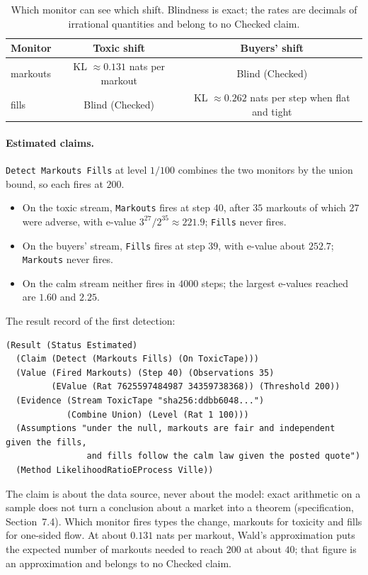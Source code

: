 \documentclass[11pt]{article}
\newcommand{\code}[1]{\texttt{#1}}
\newcommand{\spec}[1]{specification, Section~#1}
\theoremstyle{definition}
\theoremstyle{plain}
\begin{document}
\begin{table}[ht]
\centering\small
\begin{tabular}{lcc}
\toprule
Monitor & Toxic shift & Buyers' shift\\
\midrule
markouts & KL $\approx0.131$ nats per markout & Blind (Checked)\\
fills & Blind (Checked) & KL $\approx0.262$ nats per step when flat and tight\\
\bottomrule
\end{tabular}
\caption{Which monitor can see which shift. Blindness is exact; the rates are decimals of irrational
quantities and belong to no Checked claim.}\label{tab:ex4monitors}
\end{table}

\paragraph{Estimated claims.} \code{Detect Markouts Fills} at level $1/100$ combines the two monitors by
the union bound, so each fires at $200$.
\begin{itemize}
\item On the toxic stream, \code{Markouts} fires at step $40$, after $35$ markouts of which $27$ were
adverse, with e-value $3^{27}/2^{35}\approx221.9$; \code{Fills} never fires.
\item On the buyers' stream, \code{Fills} fires at step $39$, with e-value about $252.7$; \code{Markouts}
never fires.
\item On the calm stream neither fires in $4000$ steps; the largest e-values reached are $1.60$ and
$2.25$.
\end{itemize}
The result record of the first detection:
\begin{lstlisting}
(Result (Status Estimated)
  (Claim (Detect (Markouts Fills) (On ToxicTape)))
  (Value (Fired Markouts) (Step 40) (Observations 35)
         (EValue (Rat 7625597484987 34359738368)) (Threshold 200))
  (Evidence (Stream ToxicTape "sha256:ddbb6048...")
            (Combine Union) (Level (Rat 1 100)))
  (Assumptions "under the null, markouts are fair and independent given the fills,
                and fills follow the calm law given the posted quote")
  (Method LikelihoodRatioEProcess Ville))
\end{lstlisting}
The claim is about the data source, never about the model: exact arithmetic on a sample does not turn a
conclusion about a market into a theorem (\spec{7.4}). Which monitor fires types the change, markouts for
toxicity and fills for one-sided flow. At about $0.131$ nats per markout, Wald's approximation
\cite{wald} puts the expected number of markouts needed to reach $200$ at about $40$; that figure is an
approximation and belongs to no Checked claim.
\end{document}
